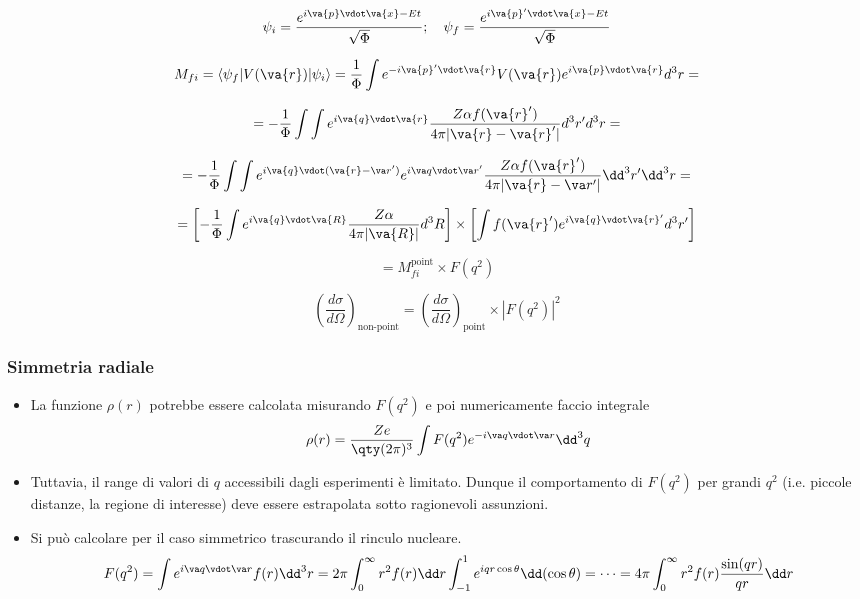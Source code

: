 \begin{itemize}
    \[
    \psi_i = \frac{e^{i \va{p} \vdot \va{x} - E t}}{\sqrt{\Phi}}; \quad \psi_f = \frac{e^{i \va{p}' \vdot \va{x} - E t}}{\sqrt{\Phi}}
    \]

    \[
    M_{fi} = \langle \psi_f | V(\va{r}) | \psi_i \rangle = \frac{1}{\Phi} \int e^{-i \va{p}' \vdot \va{r}} V(\va{r}) e^{i \va{p} \vdot \va{r}} d^3r =
    \]

    \[
    = -\frac{1}{\Phi} \int \int e^{i \va{q} \vdot \va{r}} \frac{Z \alpha f(\va{r}')}{4 \pi |\va{r} - \va{r}'|} d^3r' d^3r =
    \]

    \[
    = -\frac{1}{\Phi} \int \int e^{i \va{q} \vdot (\va{r}-\va r')}e^{i\va q\vdot \va r'} \frac{Z \alpha f(\va{r}')}{4 \pi |\va{r} -\va r'|} \dd^3r' \dd^3r =
    \]

    \[
    = \left[-\frac{1}{\Phi} \int e^{i \va{q} \vdot \va{R}} \frac{Z \alpha}{4 \pi |\va{R}|} d^3R \right] \times \left[ \int f(\va{r}') e^{i \va{q} \vdot \va{r}'} d^3r' \right]
    \]

    \[
    = M_{fi}^{\text{point}} \times F(q^2)
    \]

    \[
    \left(\frac{d\sigma}{d\Omega}\right)_{\text{non-point}} = \left(\frac{d\sigma}{d\Omega}\right)_{\text{point}} \times |F(q^2)|^2
    \]
\end{itemize}
\subsubsection{Simmetria radiale}
\begin{itemize}
    \item La funzione $\rho(r)$ potrebbe essere calcolata misurando $F(q^2)$ e poi numericamente faccio integrale
    \begin{equation*}
    \rho(r)=\frac{Ze}{\qty(2\pi)^3}\int F(q^2)e^{-i\va q\vdot\va r}\dd^3q
    \end{equation*}
    \item Tuttavia, il range di valori di $q$ accessibili dagli esperimenti è limitato. Dunque il comportamento di $F(q^2)$ per grandi $q^2$ (i.e. piccole distanze, la regione di interesse) deve essere estrapolata sotto ragionevoli assunzioni. 
    \item Si può calcolare per il caso simmetrico trascurando il rinculo nucleare.
    \begin{equation*}
    F(q^2)=\int e^{i\va q\vdot\va r}f(r)\dd^3r=2\pi\int_0^\infty r^2f(r)\dd r\int_{-1}^1e^{iqr\cos\theta}\dd(\cos\theta)=\dots=4\pi\int_0^\infty r^2f(r)\frac{\sin(qr)}{qr}\dd r
    \end{equation*} 
\end{itemize}

